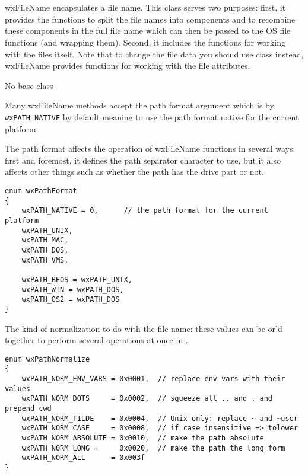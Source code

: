 
\section{}\label{wxfilename}

wxFileName encapsulates a file name. This class serves two purposes: first, it
provides the functions to split the file names into components and to recombine
these components in the full file name which can then be passed to the OS file
functions (and  wrapping them).
Second, it includes the functions for working with the files itself. Note that
to change the file data you should use  class instead,
wxFileName provides functions for working with the file attributes.


No base class


Many wxFileName methods accept the path format argument which is by\rtfsp
{\tt wxPATH\_NATIVE} by default meaning to use the path format native for the
current platform.

The path format affects the operation of wxFileName functions in several ways:
first and foremost, it defines the path separator character to use, but it also
affects other things such as whether the path has the drive part or not.

\begin{verbatim}
enum wxPathFormat
{
    wxPATH_NATIVE = 0,      // the path format for the current platform
    wxPATH_UNIX,
    wxPATH_MAC,
    wxPATH_DOS,
    wxPATH_VMS,

    wxPATH_BEOS = wxPATH_UNIX,
    wxPATH_WIN = wxPATH_DOS,
    wxPATH_OS2 = wxPATH_DOS
}
\end{verbatim}

The kind of normalization to do with the file name: these values can be
or'd together to perform several operations at once in\rtfsp
{}.

\begin{verbatim}
enum wxPathNormalize
{
    wxPATH_NORM_ENV_VARS = 0x0001,  // replace env vars with their values
    wxPATH_NORM_DOTS     = 0x0002,  // squeeze all .. and . and prepend cwd
    wxPATH_NORM_TILDE    = 0x0004,  // Unix only: replace ~ and ~user
    wxPATH_NORM_CASE     = 0x0008,  // if case insensitive => tolower
    wxPATH_NORM_ABSOLUTE = 0x0010,  // make the path absolute
    wxPATH_NORM_LONG =     0x0020,  // make the path the long form
    wxPATH_NORM_ALL      = 0x003f
}
\end{verbatim}

